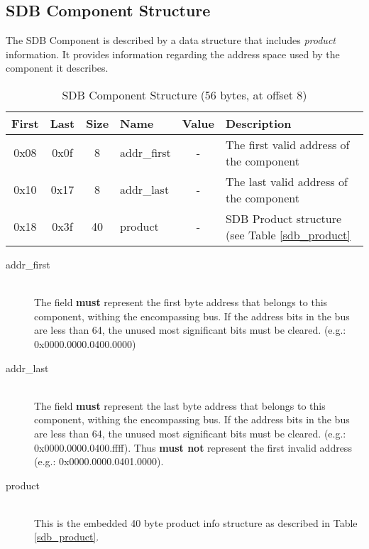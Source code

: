 \documentclass[a4paper, 12pt]{article}
\begin{document}
\subsection{SDB Component Structure}

The SDB Component is described by a data structure that includes \textit{product}
information. It provides information regarding the address space used by the
component it describes.

\begin{center}
  \begin{savenotes}
    \begin{table}[!ht]\footnotesize
      \caption{SDB Component Structure (56 bytes, at offset 8)}\label{sdb_component}\centering
        \begin{tabular}{| c | c | c | l | c | p{5cm} |} \hline
        First & Last & Size & Name & Value & Description \\ \hline
        0x08 & 0x0f & 8 & addr\_first & - & The first valid address of the component \\ \hline
        0x10 & 0x17 & 8 & addr\_last & - & The last valid address of the component \\ \hline
        0x18 & 0x3f & 40 & product & - & SDB Product structure (see Table \ref{sdb_product} \\ \hline
        \end{tabular}
    \end{table}
  \end{savenotes}
\end{center}

\begin{description}
\item[addr\_first] \hfill \\
The field \textbf{must} represent the first byte address that belongs to this component,
withing the encompassing bus. If the address bits in the bus are less than 64, the
unused most significant bits must be cleared. (e.g.: 0x0000.0000.0400.0000)

\item[addr\_last] \hfill \\
The field \textbf{must} represent the last byte address that belongs to this component,
withing the encompassing bus. If the address bits in the bus are less than 64, the
unused most significant bits must be cleared. (e.g.: 0x0000.0000.0400.ffff).
Thus \textbf{must not} represent the first invalid address (e.g.: 0x0000.0000.0401.0000).

\item[product] \hfill \\
This is the embedded 40 byte product info structure as described in Table \ref{sdb_product}.
\end{description}
\end{document}
